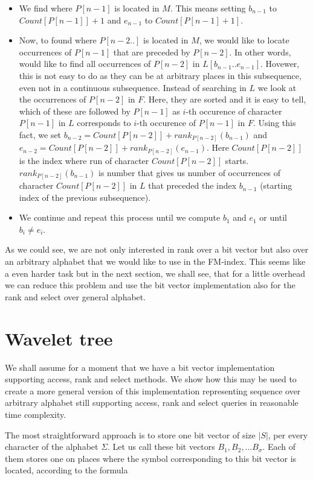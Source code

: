 \begin{itemize}
	\item We find where $P[n-1]$ is located in $M$. This means setting $b_{n-1}$ to
	$Count[P[n-1]]+1$ and $e_{n-1}$ to $Count[P[n-1]+1]$.
	\item Now, to found where $P[n-2..]$ is located in $M$, we would like to locate occurrences
	of $P[n-1]$ that are preceded by $P[n-2]$. In other words, would like to find all
	occurrences of $P[n-2]$ in $L[b_{n-1}..e_{n-1}]$. Hovewer, this is not easy to do
	as they can be at arbitrary places in this subsequence, even not in a continuous
	subsequence. Instead of searching in $L$ we look at the occurrences of $P[n-2]$ in
	$F$. Here, they are sorted and it is easy to tell, which of these are followed by
	$P[n-1]$ as $i$-th occurence of character $P[n-1]$ in $L$ corresponds to $i$-th
	occurence of $P[n-1]$ in $F$. Using this fact, we set
	$b_{n-2} = Count[P[n-2]] + rank_{P[n-2]}(b_{n-1})$ and
	$e_{n-2} = Count[P[n-2]] + rank_{P[n-2]}(e_{n-1})$. Here $Count[P[n-2]]$ is the index
	where run of character $Count[P[n-2]]$ starts. $rank_{P[n-2]}(b_{n-1})$ is number
	that gives us number of occurrences of character $Count[P[n-2]]$ in $L$ that preceded
	the index $b_{n-1}$ (starting index of the previous subsequence).
	\item We continue and repeat this process until we compute $b_1$ and $e_1$ or until
	$b_i\neq e_i$.
\end{itemize}

As we could see, we are not only interested in rank over a bit vector but also over an arbitrary
alphabet that we would like to use in the FM-index. This seems like a even harder task but in
the next section, we shall see, that for a little overhead we can reduce this problem and use
the bit vector implementation also for the rank and select over general alphabet.

\section{Wavelet tree}
\label{section:WaweletTree}

We shall assume for a moment that we have a bit vector implementation supporting
access, rank and select methods. We show how this may be used to create
a more general version of this implementation representing sequence over arbitrary
alphabet still supporting access, rank and select queries in reasonable time complexity.

The most straightforward approach is to store one bit vector of size $|S|$,
per every character of the alphabet $\Sigma$. Let us call these bit vectors $B_1,
B_2, \ldots B_{\sigma}$. Each of them stores one on places where the symbol corresponding
to this bit vector is located, according to the formula

